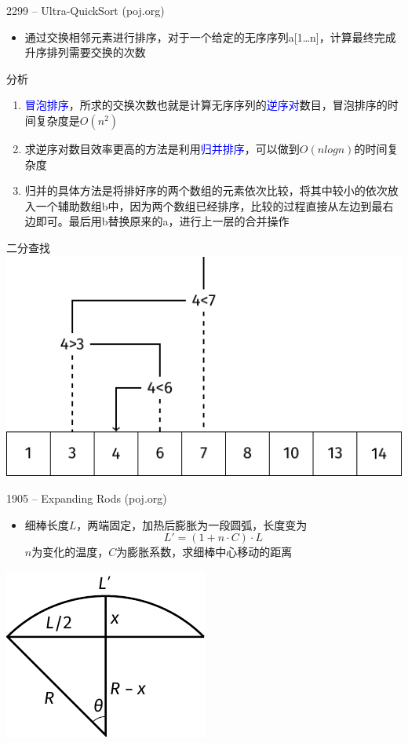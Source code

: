 \begin{frame}{2299 -- Ultra-QuickSort (poj.org)}
    \begin{itemize}
        \item 通过交换相邻元素进行排序，对于一个给定的无序序列a[1…n]，计算最终完成升序排列需要交换的次数
    \end{itemize}
    \vfill
    分析
    \begin{enumerate}
        \item \textcolor{blue}{冒泡排序}，所求的交换次数也就是计算无序序列的\textcolor{blue}{逆序对}数目，冒泡排序的时间复杂度是$O(n^2)$
        \item 求逆序对数目效率更高的方法是利用\textcolor{blue}{归并排序}，可以做到$O(nlogn)$的时间复杂度
        \item 归并的具体方法是将排好序的两个数组的元素依次比较，将其中较小的依次放入一个辅助数组b中，因为两个数组已经排序，比较的过程直接从左边到最右边即可。最后用b替换原来的a，进行上一层的合并操作
    \end{enumerate}
\end{frame}
\begin{frame}{二分查找}
    \includegraphics[center]{fig/2-4.pdf}
\end{frame}
\begin{frame}{1905 -- Expanding Rods (poj.org)}
    \begin{itemize}
        \item 细棒长度$L$，两端固定，加热后膨胀为一段圆弧，长度变为
        $$L'=(1+n\cdot C)\cdot L$$
        $n$为变化的温度，$C$为膨胀系数，求细棒中心移动的距离
    \end{itemize}
    \vfill
    \includegraphics[center]{fig/2-5.pdf}
\end{frame}
